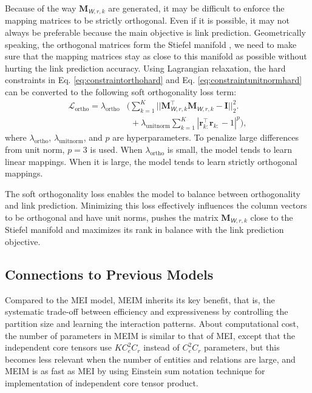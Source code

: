 \documentclass{article}
\def\vr{{\bm{r}}}
\def\mI{{\bm{I}}}
\def\mM{{\bm{M}}}
\newcommand{\tens}[1]{\bm{\mathsfit{#1}}}
\def\tW{{\tens{W}}}
\def\gL{{\mathcal{L}}}
\theoremstyle{plain}
\theoremstyle{remark}
\begin{document}
Because of the way $ \mM_{\tW, r, k} $ are generated, it may be difficult to enforce the mapping matrices to be strictly orthogonal. Even if it is possible, it may not always be preferable because the main objective is link prediction. Geometrically speaking, the orthogonal matrices form the Stiefel manifold \cite{sokol_informationgeometryorthogonal_2020}, we need to make sure that the mapping matrices stay as close to this manifold as possible without hurting the link prediction accuracy. Using Lagrangian relaxation, the hard constraints in Eq. \ref{eq:constraintorthohard} and Eq. \ref{eq:constraintunitnormhard} can be converted to the following soft orthogonality loss term:
\begin{align}
\gL_{\text{ortho}} = \lambda_{\text{ortho}} &\bigl( \textstyle\sum_{k = 1}^{K} || \mM_{\tW, r, k}^\top \mM_{\tW, r, k} - \mI ||_2^2. \nonumber\\
&\ \ + \lambda_{\text{unitnorm}} \textstyle\sum_{k = 1}^{K} |\vr_{k:}^\top \vr_{k:} - 1|^p \bigr), \label{eq:constraintorthogonalityunitnorm}
\end{align}
where $ \lambda_{\text{ortho}} $, $ \lambda_{\text{unitnorm}} $, and $ p $ are hyperparameters. To penalize large differences from unit norm, $ p=3 $ is used. When $ \lambda_{\text{ortho}} $ is small, the model tends to learn linear mappings. When it is large, the model tends to learn strictly orthogonal mappings. 

The soft orthogonality loss enables the model to balance between orthogonality and link prediction. Minimizing this loss effectively influences the column vectors to be orthogonal and have unit norms, pushes the matrix $ \mM_{\tW, r, k} $ close to the Stiefel manifold and maximizes its rank in balance with the link prediction objective. 

\subsection{Connections to Previous Models} \label{sect:connection_advantage}
Compared to the MEI model, MEIM inherits its key benefit, that is, the systematic trade-off between efficiency and expressiveness by controlling the partition size and learning the interaction patterns. About computational cost, the number of parameters in MEIM is similar to that of MEI, except that the independent core tensors use $ K C_e^2 C_r $ instead of $ C_e^2 C_r $ parameters, but this becomes less relevant when the number of entities and relations are large, and MEIM is as fast as MEI by using Einstein sum notation technique for implementation of independent core tensor product. 
\end{document}
